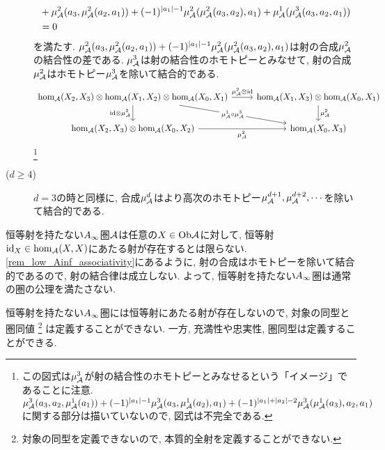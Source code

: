 \documentclass[uplatex, a4paper, 14Q, dvipdfmx]{jsarticle}
\begin{document}
\begin{remark}
\begin{description}
\begin{align*}
      &+ \mu^2_{\mathcal{A}}(a_3, \mu^2_{\mathcal{A}}(a_2,a_1)) + (-1)^{|a_1|-1} \mu^2_{\mathcal{A}}(\mu^2_{\mathcal{A}}(a_3,a_2), a_1) + \mu^1_{\mathcal{A}}(\mu^3_{\mathcal{A}}(a_3,a_2,a_1)) \\
      &= 0
    \end{align*}
    を満たす. 
    $\mu^2_{\mathcal{A}}(a_3, \mu^2_{\mathcal{A}}(a_2,a_1)) + (-1)^{|a_1|-1} \mu^2_{\mathcal{A}}(\mu^2_{\mathcal{A}}(a_3,a_2), a_1)$は射の合成$\mu^2_{\mathcal{A}}$の結合性の差である. 
    $\mu^3_{\mathcal{A}}$は射の結合性のホモトピーとみなせて, 射の合成$\mu^2_{\mathcal{A}}$はホモトピー$\mu^3_{\mathcal{A}}$を除いて結合的である.
    \[\begin{tikzcd}
      {\hom_\A(X_2,X_3) \otimes \hom_\A(X_1,X_2) \otimes \hom_\A(X_0,X_1)} & {\hom_\A(X_1,X_3) \otimes \hom_\A(X_0,X_1)} \\
      {\hom_\A(X_2,X_3) \otimes \hom_\A(X_0,X_2)} & {\hom_\A(X_0,X_3)}
      \arrow["{\mu^2_\A \otimes \id}", from=1-1, to=1-2]
      \arrow["{\mu^2_\A}", from=1-2, to=2-2]
      \arrow["{\id \otimes \mu^2_\A}"', from=1-1, to=2-1]
      \arrow["{\mu^2_\A}"', from=2-1, to=2-2]
      \arrow["{\mu^1_\A \circ \mu^3_\A}"{description}, from=1-1, to=2-2]
    \end{tikzcd}\]
    \footnote{
      この図式は$\mu^3_{\mathcal{A}}$が射の結合性のホモトピーとみなせるという「イメージ」であることに注意. 
      $\mu^3_{\mathcal{A}}(a_3, a_2, \mu^1_{\mathcal{A}}(a_1)) + (-1)^{|a_1|-1} \mu^3_{\mathcal{A}}(a_3, \mu^1_{\mathcal{A}}(a_2), a_1) + (-1)^{|a_1|+|a_2|-2} \mu^3_{\mathcal{A}}(\mu^1_{\mathcal{A}}(a_3), a_2, a_1)$に関する部分は描いていないので, 図式は不完全である. 
    }
    \item[($d \geq 4$)] $d=3$の時と同様に, 合成$\mu^d_{\mathcal{A}}$はより高次のホモトピー$\mu^{d+1}_{\mathcal{A}},\mu^{d+2}_{\mathcal{A}},\cdots$を除いて結合的である. 
  \end{description}
\end{remark}

\begin{remark}
  恒等射を持たない$A_{\infty}$圏$\mathcal{A}$は任意の$X \in \mathrm{Ob}\mathcal{A}$に対して, 恒等射$\mathrm{id}_X \in \hom_{\mathcal{A}}(X,X)$にあたる射が存在するとは限らない. 
  \cref{rem_low_Ainf_associativity}にあるように, 射の合成はホモトピーを除いて結合的であるので, 射の結合律は成立しない. 
  よって, 恒等射を持たない$A_{\infty}$圏は通常の圏の公理を満たさない. 
\end{remark}

\begin{remark}
  恒等射を持たない$A_{\infty}$圏には恒等射にあたる射が存在しないので, 対象の同型と圏同値
  \footnote{
    対象の同型を定義できないので, 本質的全射を定義することができない. 
  }
  は定義することができない. 
  一方, 充満性や忠実性, 圏同型は定義することができる. 
\end{remark}
\end{document}
